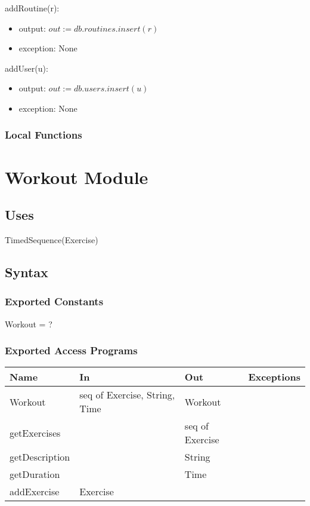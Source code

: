 \documentclass[12pt, titlepage]{article}
\begin{document}
addRoutine(r):
\begin{itemize}
	\item output: $out := db.routines.insert(r)$
	\item exception: None
\end{itemize}

addUser(u):
\begin{itemize}
	\item output: $out := db.users.insert(u)$
	\item exception: None
\end{itemize}



\subsubsection{Local Functions}


\newpage

\section{Workout Module}

\subsection{Uses}
TimedSequence(Exercise)
\subsection{Syntax}

\subsubsection{Exported Constants}
Workout = ?
\subsubsection{Exported Access Programs}

\begin{center}
	\begin{tabular}{p{2cm} p{4cm} p{4cm} p{2cm}}
		\hline
		\textbf{Name} & \textbf{In} & \textbf{Out} & \textbf{Exceptions} \\
		\hline
		Workout & seq of Exercise, String, Time & Workout &  \\
		getExercises &  & seq of Exercise &  \\
		getDescription &  & String &  \\
		getDuration &  & Time &  \\
		addExercise & Exercise & &  \\
		\hline
	\end{tabular}
\end{center}
\end{document}

